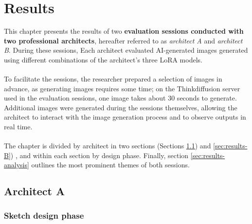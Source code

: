 \chapter{Results}
This chapter presents the results of two \textbf{evaluation sessions conducted with two professional architects}, hereafter referred to as \textit{architect A} and \textit{architect B}. During these sessions, Each architect evaluated AI-generated images generated using different combinations of the architect's three LoRA models.\\~\\
To facilitate the sessions, the researcher prepared a selection of images in advance, as generating images requires some time; on the Thinkdiffusion server used in the evaluation sessions, one image takes about 30 seconds to generate. Additional images were generated during the sessions themselves, allowing the architect to interact with the image generation process and to observe outputs in real time.\\~\\
The chapter is divided by architect in two sections (Sections \ref{sec: results-A}) and \ref{sec:results-B}) , and within each section by design phase. Finally, section \ref{sec:results-analysis} outlines the most prominent themes of both sessions.
\newpage
\section{Architect A}\label{sec: results-A}
\subsection{Sketch design phase}

